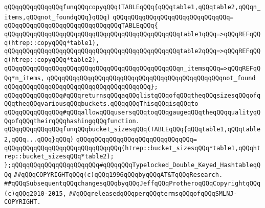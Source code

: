 \verb|qQQqqQQqqQQqqQQqfunqQQqcopyqQQq(TABLEqQQq{qQQqtable1,qQQqtable2,qQQqn_items,qQQqnot_foundqQQq}qQQq)|\newline
\verb|qQQqqQQqqQQqqQQqqQQqqQQqqQQqqQQq=|\newline
\verb|qQQqqQQqqQQqqQQqqQQqqQQqqQQqqQQqTABLEqQQq{|\newline
\verb|qQQqqQQqqQQqqQQqqQQqqQQqqQQqqQQqqQQqqQQqqQQqqQQqtable1qQQq=>qQQqREFqQQq(htrep::copyqQQq*table1),|\newline
\verb|qQQqqQQqqQQqqQQqqQQqqQQqqQQqqQQqqQQqqQQqqQQqqQQqtable2qQQq=>qQQqREFqQQq(htrep::copyqQQq*table2),|\newline
\verb|qQQqqQQqqQQqqQQqqQQqqQQqqQQqqQQqqQQqqQQqqQQqqQQqn_itemsqQQq=>qQQqREFqQQq*n_items,|\newline
\verb|qQQqqQQqqQQqqQQqqQQqqQQqqQQqqQQqqQQqqQQqqQQqqQQqnot_found|\newline
\verb|qQQqqQQqqQQqqQQqqQQqqQQqqQQqqQQqqQQqqQQq};|\newline
\newline
\verb|qQQqqQQqqQQqqQQq#qQQqreturnsqQQqaqQQqlistqQQqofqQQqtheqQQqsizesqQQqofqQQqtheqQQqvariousqQQqbuckets.qQQqqQQqThisqQQqisqQQqto|\newline
\verb|qQQqqQQqqQQqqQQq#qQQqallowqQQqusersqQQqtoqQQqgaugeqQQqtheqQQqqualityqQQqofqQQqtheirqQQqhashingqQQqfunction.|\newline
\newline
\verb|qQQqqQQqqQQqqQQqfunqQQqbucket_sizesqQQq(TABLEqQQq{qQQqtable1,qQQqtable2,qQQq...qQQq}qQQq)|\newline
\verb|qQQqqQQqqQQqqQQqqQQqqQQqqQQqqQQq=|\newline
\verb|qQQqqQQqqQQqqQQqqQQqqQQqqQQqqQQq(htrep::bucket_sizesqQQq*table1,qQQqhtrep::bucket_sizesqQQq*table2);|\newline
\newline
\newline
\verb|};qQQqqQQqqQQqqQQqqQQqqQQq#qQQqqQQqTypelocked_Double_Keyed_HashtableqQQq|\newline
\newline
\newline
\verb|##qQQqCOPYRIGHTqQQq(c)qQQq1996qQQqbyqQQqAT&TqQQqResearch.|\newline
\verb|##qQQqSubsequentqQQqchangesqQQqbyqQQqJeffqQQqProtheroqQQqCopyrightqQQq(c)qQQq2010-2015,|\newline
\verb|##qQQqreleasedqQQqperqQQqtermsqQQqofqQQqSMLNJ-COPYRIGHT.|\newline

